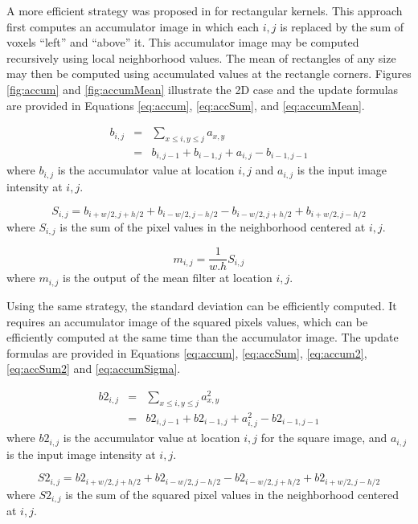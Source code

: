 \documentclass{InsightArticle}
\begin{document}
A more efficient strategy was proposed in \cite{Crow84} for
rectangular kernels. This approach first computes an accumulator image
in which each $i,j$ is replaced by the sum of voxels ``left'' and
``above'' it. This accumulator image may be computed recursively using
local neighborhood values. The mean of rectangles of any size may then
be computed using accumulated values at the rectangle corners. Figures
\ref{fig:accum} and \ref{fig:accumMean} illustrate the 2D case and the
update formulas are provided in Equations \ref{eq:accum}, \ref{eq:accSum}, and
\ref{eq:accumMean}.

\begin{eqnarray}
\label{eq:accum}
b_{i,j} & = & \sum_{x \leq i, y \leq j} a_{x,y} \\ \nonumber
	& = & b_{i,j-1} + b_{i-1, j} + a_{i,j} - b_{i-1, j-1}
\end{eqnarray}
where $b_{i,j}$ is the accumulator value at location $i,j$ and $a_{i,j}$ is the input image intensity at $i,j$.

\begin{equation}
\label{eq:accSum}
S_{i,j} = b_{i+w/2,j+h/2} + b_{i-w/2,j-h/2} - b_{i-w/2,j+h/2} + b_{i+w/2,j-h/2}
\end{equation}
where $S_{i,j}$ is the sum of the pixel values in the neighborhood centered at $i,j$.

\begin{equation}
\label{eq:accumMean}
m_{i,j} = \frac{1}{w.h}S_{i,j}
\end{equation}
where $m_{i,j}$ is the output of the mean filter at location $i,j$.

Using the same strategy, the standard deviation can be efficiently computed.
It requires an accumulator image of the squared pixels values, which can be
efficiently computed at the same time than the accumulator image. The update
formulas are provided in Equations \ref{eq:accum}, \ref{eq:accSum},
\ref{eq:accum2}, \ref{eq:accSum2} and \ref{eq:accumSigma}.

\begin{eqnarray}
\label{eq:accum2}
b2_{i,j} & = & \sum_{x \leq i, y \leq j} a_{x,y}^2 \\ \nonumber
	& = & b2_{i,j-1} + b2_{i-1, j} + a_{i,j}^2 - b2_{i-1, j-1}
\end{eqnarray}
where $b2_{i,j}$ is the accumulator value at location $i,j$ for the square image, and $a_{i,j}$ is the input image intensity at $i,j$.

\begin{equation}
\label{eq:accSum2}
S2_{i,j} = b2_{i+w/2,j+h/2} + b2_{i-w/2,j-h/2} - b2_{i-w/2,j+h/2} + b2_{i+w/2,j-h/2}
\end{equation}
where $S2_{i,j}$ is the sum of the squared pixel values in the neighborhood centered at $i,j$.
\end{document}
